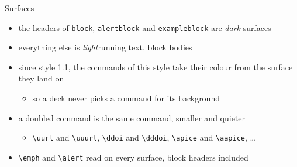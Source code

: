 \begin{frame}[c]{Surfaces}
%
\begin{itemize}
	\item the headers of \texttt{block}, \texttt{alertblock} and \texttt{exampleblock} are \emph{dark} surfaces
	\item everything else is \emph{light}\textemdash{}running text, block bodies
	\item since style 1.1, the commands of this style take their colour from the surface they land on
	\begin{itemize}
		\item so a deck never picks a command for its background
	\end{itemize}
	\item a doubled command is the same command, \alert{smaller and quieter}
	\begin{itemize}
		\item \texttt{\textbackslash{}uurl} and \texttt{\textbackslash{}uuurl}, \texttt{\textbackslash{}ddoi} and \texttt{\textbackslash{}dddoi}, \texttt{\textbackslash{}apice} and \texttt{\textbackslash{}aapice}, \ldots
	\end{itemize}
	\item \texttt{\textbackslash{}emph} and \texttt{\textbackslash{}alert} read on every surface, block headers included
\end{itemize}
%
\end{frame}
